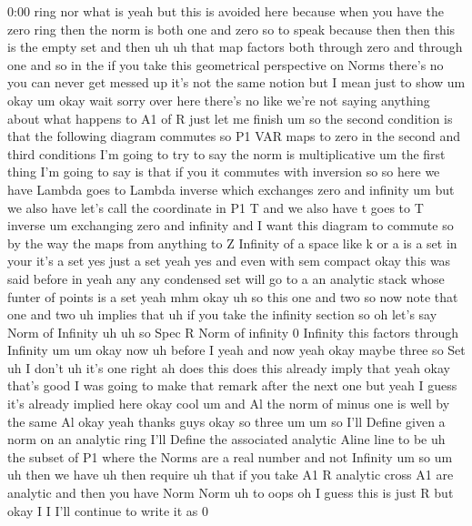 \begin{unfinished}{0:00}
ring  nor  what
is  yeah  but  this  is  avoided  here  because
when  you  have  the  zero  ring  then  the
norm  is  both  one  and  zero  so  to  speak
because  then  then  this  is  the  empty  set
and  then  uh  uh  that  map  factors  both
through  zero  and  through  one  and  so  in
the  if  you  take  this  geometrical
perspective  on  Norms  there's  no  you  can
never  get  messed
up  it's  not  the  same  notion  but  I  mean
just  to
show  um
okay
um  okay  wait  sorry
over  here  there's  no  like  we're  not
saying  anything  about  what  happens  to  A1
of
R  just  let  me  finish
um  so  the  second  condition  is  that  the
following  diagram  commutes  so  P1  VAR
maps  to  zero  in  the  second  and  third
conditions  I'm  going  to  try  to  say  the
norm  is
multiplicative  um  the  first  thing  I'm
going  to  say  is  that  if  you  it  commutes
with  inversion  so  so  here  we  have  Lambda
goes  to  Lambda  inverse  which  exchanges
zero  and  infinity
um  but  we  also  have  let's  call  the
coordinate  in  P1  T  and  we  also  have  t
goes  to  T
inverse  um  exchanging  zero  and  infinity
and  I  want  this  diagram  to  commute  so  by
the  way  the  maps  from  anything  to  Z
Infinity  of  a  space  like  k  or  a  is  a  set
in  your  it's  a  set  yes  just  a  set  yeah
yes  and  even  with  sem  compact  okay  this
was  said  before  in  yeah  any  any
condensed  set  will  go  to  a  an  analytic
stack  whose  funter  of  points  is  a  set
yeah
mhm
okay  uh  so  this  one  and  two  so  now  note
that  one  and  two  uh  implies  that  uh  if
you  take  the  infinity
section  so  oh  let's  say  Norm  of  Infinity
uh
uh  so  Spec
R  Norm  of  infinity  0  Infinity  this
factors  through
Infinity
um
um  okay  now  uh  before  I  yeah  and  now
yeah  okay  maybe  three  so  Set  uh  I  don't
uh  it's  one
right
ah  does  this  does  this  already  imply
that  yeah  okay  that's  good  I  was  going
to  make  that  remark  after  the  next  one
but  yeah  I  guess  it's  already  implied
here  okay  cool
um  and  Al  the  norm  of  minus  one  is  well
by  the  same
Al
okay  yeah  thanks
guys
okay  so  three
um  um  so  I'll  Define  given  a  norm  on  an
analytic  ring  I'll  Define  the  associated
analytic  Aline  line  to  be  uh  the  subset
of  P1  where  the  Norms  are  a  real  number
and  not
Infinity
um  so
um  uh  then  we  have  uh  then
require  uh  that  if  you  take
A1  R  analytic  cross  A1  are  analytic  and
then  you  have  Norm
Norm  uh  to
oops  oh  I  guess  this  is  just  R  but  okay
I  I  I'll  continue  to  write  it  as  0

\end{unfinished}
